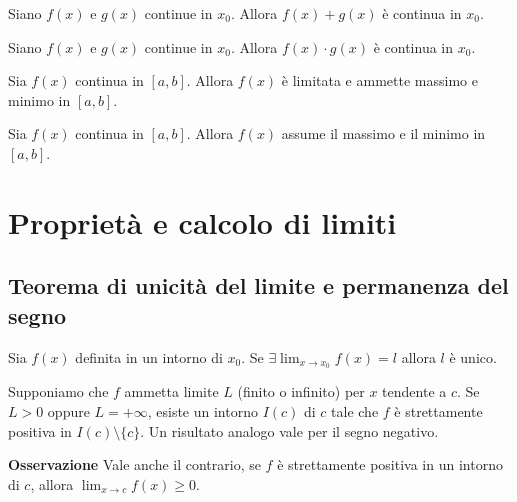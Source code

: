 \documentclass{book}
\begin{document}
\begin{theorem}
    Siano \(f(x)\) e \(g(x)\) continue in \(x_0\). Allora \(f(x) + g(x)\) è continua in \(x_0\).
\end{theorem}

\begin{theorem}
    Siano \(f(x)\) e \(g(x)\) continue in \(x_0\). Allora \(f(x) \cdot g(x)\) è continua in \(x_0\).
\end{theorem}

\begin{theorem}
    Sia \(f(x)\) continua in \([a,b]\). Allora \(f(x)\) è limitata e ammette massimo e minimo in \([a,b]\).
\end{theorem}

\begin{theorem}
    Sia \(f(x)\) continua in \([a,b]\). Allora \(f(x)\) assume il massimo e il minimo in \([a,b]\).
\end{theorem}

\chapter{Proprietà e calcolo di limiti}

\section{Teorema di unicità del limite e permanenza del segno}

\begin{theorem}
    Sia \(f(x)\) definita in un intorno di \(x_0\). Se \(\exists \lim_{x \to x_0} f(x) = l\) allora \(l\) è unico.
\end{theorem}


\begin{theorem}
    Supponiamo che \(f\) ammetta limite \(L\) (finito o infinito) per \(x\) tendente a \(c\). Se \(L > 0\) oppure \(L = +\infty\), esiste un intorno \(I(c)\) di \(c\) tale che \(f\) è strettamente positiva in \(I(c) \setminus \{c\}\). Un risultato analogo vale per il segno negativo.

    \textbf{Osservazione}
    Vale anche il contrario, se \(f\) è strettamente positiva in un intorno di \(c\), allora \(\lim_{x \to c} f(x) \geq 0\).
\end{theorem}
\end{document}
